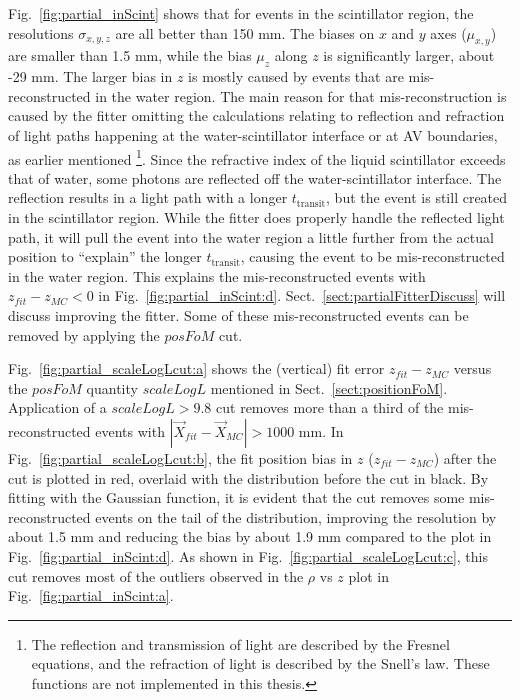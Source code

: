 Fig.~\ref{fig:partial_inScint} shows that for events in the scintillator region, the resolutions $\sigma_{x,y,z}$ are all better than 150 mm. The biases on $x$ and $y$ axes ($\mu_{x,y}$) are smaller than 1.5 mm, while the bias $\mu_z$ along $z$ is significantly larger, about -29 mm. The larger bias in $z$ is mostly caused by events that are mis-reconstructed in the water region. The main reason for that mis-reconstruction is caused by the fitter omitting the calculations relating to reflection and refraction of light paths happening at the water-scintillator interface or at AV boundaries, as earlier mentioned \footnote{The reflection and transmission of light are described by the Fresnel equations, and the refraction of light is described by the Snell's law. These functions are not implemented in this thesis.}. Since the refractive index of the liquid scintillator exceeds that of water, some photons are reflected off the water-scintillator interface. The reflection results in a light path with a longer $t_\mathrm{transit}$, but the event is still created in the scintillator region. While the fitter does properly handle the reflected light path, it will pull the event into the water region a little further from the actual position to ``explain'' the longer $t_\mathrm{transit}$, causing the event to be mis-reconstructed in the water region. This explains the mis-reconstructed events with $z_{fit}-z_{MC}<0$ in Fig.~\ref{fig:partial_inScint:d}. Sect.~\ref{sect:partialFitterDiscuss} will discuss improving the fitter. Some of these mis-reconstructed events can be removed by applying the $posFoM$ cut.

Fig.~\ref{fig:partial_scaleLogLcut:a} shows the (vertical) fit error $z_{fit}-z_{MC}$ versus the $posFoM$ quantity $scaleLogL$ mentioned in Sect.~\ref{sect:positionFoM}. Application of a $scaleLogL>9.8$ cut removes more than a third of the mis-reconstructed events with $|\vec{X}_{fit}-\vec{X}_{MC}|>1000$ mm. In Fig.~\ref{fig:partial_scaleLogLcut:b}, the fit position bias in $z$ ($z_{fit}-z_{MC}$) after the cut is plotted in red, overlaid with the distribution before the cut in black. By fitting with the Gaussian function, it is evident that the cut removes some mis-reconstructed events on the tail of the distribution, improving the resolution by about 1.5 mm and reducing the bias by about 1.9 mm compared to the plot in Fig.~\ref{fig:partial_inScint:d}. As shown in Fig.~\ref{fig:partial_scaleLogLcut:c}, this cut removes most of the outliers observed in the $\rho$ vs $z$ plot in Fig.~\ref{fig:partial_inScint:a}.

